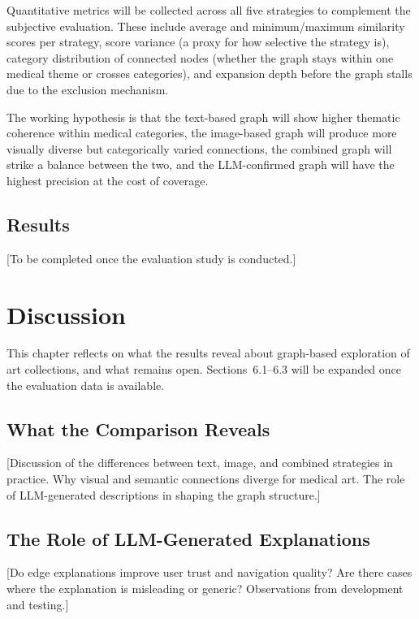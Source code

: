 \documentclass[12pt, a4paper]{article}
\begin{document}
Quantitative metrics will be collected across all five strategies to complement the subjective
evaluation. These include average and minimum/maximum similarity scores per strategy, score
variance (a proxy for how selective the strategy is), category distribution of connected nodes
(whether the graph stays within one medical theme or crosses categories), and expansion depth
before the graph stalls due to the exclusion mechanism.

The working hypothesis is that the text-based graph will show higher thematic coherence within
medical categories, the image-based graph will produce more visually diverse but categorically
varied connections, the combined graph will strike a balance between the two, and the
LLM-confirmed graph will have the highest precision at the cost of coverage.

\subsection{Results}

[To be completed once the evaluation study is conducted.]

\section{Discussion}

This chapter reflects on what the results reveal about graph-based exploration of art collections,
and what remains open. Sections~6.1--6.3 will be expanded once the evaluation data is available.

\subsection{What the Comparison Reveals}

[Discussion of the differences between text, image, and combined strategies in practice. Why
visual and semantic connections diverge for medical art. The role of LLM-generated descriptions
in shaping the graph structure.]

\subsection{The Role of LLM-Generated Explanations}

[Do edge explanations improve user trust and navigation quality? Are there cases where the
explanation is misleading or generic? Observations from development and testing.]
\end{document}
